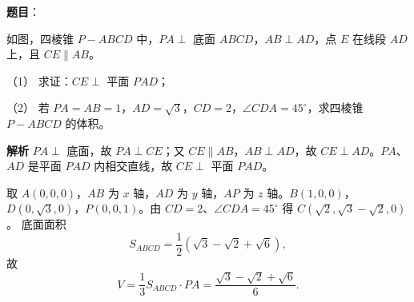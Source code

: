 \begin{answer}

\textbf{题目}：

如图，四棱锥 $P-ABCD$ 中，$PA\perp$ 底面 $ABCD$，$AB\perp AD$，点 $E$ 在线段 $AD$ 上，且 $CE\parallel AB$。

（1） 求证：$CE\perp$ 平面 $PAD$；

（2） 若 $PA=AB=1$，$AD=\sqrt3$，$CD=2$，$\angle CDA=45^\circ$，求四棱锥 $P-ABCD$ 的体积。
\nopagebreak[4]
\begin{center}\end{center}
\nopagebreak[4]
\textbf{解析}
$PA\perp$ 底面，故 $PA\perp CE$；又 $CE\parallel AB$，$AB\perp AD$，故 $CE\perp AD$。$PA$、$AD$ 是平面 $PAD$ 内相交直线，故 $CE\perp$ 平面 $PAD$。

取 $A(0,0,0)$，$AB$ 为 $x$ 轴，$AD$ 为 $y$ 轴，$AP$ 为 $z$ 轴。$B(1,0,0)$，$D(0,\sqrt3,0)$，$P(0,0,1)$。由 $CD=2$、$\angle CDA=45^\circ$ 得 $C(\sqrt2,\sqrt3-\sqrt2,0)$。
底面面积
\nopagebreak[4]
\[S_{ABCD}=\frac12\left(\sqrt3-\sqrt2+\sqrt6\right),\]
故
\nopagebreak[4]
\[V=\frac13S_{ABCD}\cdot PA=\frac{\sqrt3-\sqrt2+\sqrt6}6.\]



\end{answer}
